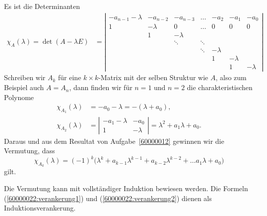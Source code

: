 \begin{loesung}
Es ist die Determinanten
\begin{align*}
\chi_A(\lambda)
=
\det(A-\lambda E)
&=
\left|\begin{matrix}
-a_{n-1}-\lambda&-a_{n-2}&-a_{n-3}&\dots & -a_2   & -a_1   & -a_0  \\
   1            &-\lambda&   0    &\dots &   0    &   0    &   0   \\
                &   1    &-\lambda&      &        &        &       \\
                &        &\ddots  &\ddots&        &        &       \\
                &        &        &\ddots&-\lambda&        &       \\
                &        &        &      &   1    &-\lambda&       \\
                &        &        &      &        &   1    &-\lambda
\end{matrix}\right|
\end{align*}
Schreiben wir $A_k$ für eine $k\times k$-Matrix mit der selben
Struktur wie $A$, also zum Beispiel auch $A=A_n$, dann finden wir
für $n=1$ und $n=2$ die charakteristischen Polynome
\begin{align}
\chi_{A_1}(\lambda)
&=
-a_0-\lambda = -(\lambda+a_0),
\label{60000022:verankerung1}
\\
\chi_{A_2}(\lambda)
&=
\left|\begin{matrix}
-a_1-\lambda&  -a_0  \\
1           &-\lambda
\end{matrix}\right|
=\lambda^2+a_1\lambda+a_0.
\label{60000022:verankerung2}
\end{align}
Daraus und aus dem Resultat von Aufgabe~\ref{60000012} gewinnen wir
die Vermutung, dass 
\[
\chi_{A_k}(\lambda)
=
(-1)^k\bigl(
\lambda^k+a_{k-1}\lambda^{k-1}+a_{k-2}\lambda^{k-2}+\dots a_1\lambda+a_0
\bigr)
\]
gilt.

Die Vermutung kann mit vollständiger Induktion bewiesen werden.
Die Formeln (\ref{60000022:verankerung1}) und (\ref{60000022:verankerung2})
dienen als Induktionsverankerung.


\end{loesung}
